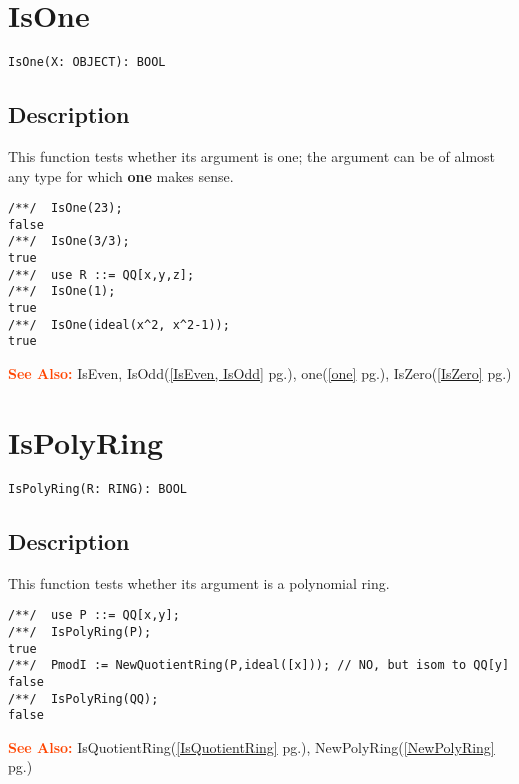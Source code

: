 \documentclass[a4paper]{mybook}
\newenvironment{command}{}{} %
\newcommand\SeeAlso{\par\textcolor{OrangeRed}{\textbf{\large See Also: }}}
\begin{document}
\section{IsOne}
\label{IsOne}
\begin{command} %


\begin{Verbatim}[label=syntax, rulecolor=\color{MidnightBlue},
frame=single]
IsOne(X: OBJECT): BOOL
\end{Verbatim}


\subsection*{Description}

This function tests whether its argument is one; the argument can be
of almost any type for which \textbf{one} makes sense.
\begin{Verbatim}[label=example, rulecolor=\color{PineGreen}, frame=single]
/**/  IsOne(23);
false
/**/  IsOne(3/3);
true
/**/  use R ::= QQ[x,y,z];
/**/  IsOne(1);
true
/**/  IsOne(ideal(x^2, x^2-1));
true
\end{Verbatim}


\SeeAlso %
  IsEven, IsOdd(\ref{IsEven, IsOdd} pg.\pageref{IsEven, IsOdd}), 
    one(\ref{one} pg.\pageref{one}), 
    IsZero(\ref{IsZero} pg.\pageref{IsZero})
\end{command} %

\section{IsPolyRing}
\label{IsPolyRing}
\begin{command} %


\begin{Verbatim}[label=syntax, rulecolor=\color{MidnightBlue},
frame=single]
IsPolyRing(R: RING): BOOL
\end{Verbatim}


\subsection*{Description}

This function tests whether its argument is a polynomial ring.
\begin{Verbatim}[label=example, rulecolor=\color{PineGreen}, frame=single]
/**/  use P ::= QQ[x,y];
/**/  IsPolyRing(P);
true
/**/  PmodI := NewQuotientRing(P,ideal([x])); // NO, but isom to QQ[y]
false
/**/  IsPolyRing(QQ);
false
\end{Verbatim}


\SeeAlso %
  IsQuotientRing(\ref{IsQuotientRing} pg.\pageref{IsQuotientRing}), 
    NewPolyRing(\ref{NewPolyRing} pg.\pageref{NewPolyRing})
\end{command} %
\end{document}

